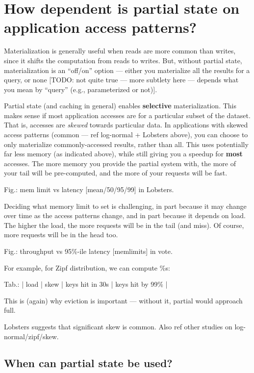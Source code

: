 \section{How dependent is partial state on application access patterns?}
\label{s:eval:patterns}

Materialization is generally useful when reads are more common than
writes, since it shifts the computation from reads to writes.
But, without partial state, materialization is an ``off/on'' option —
either you materialize all the results for a query, or none [TODO: not
quite true — more subtlety here — depends what you mean by ``query''
(e.g., parameterized or not)].

Partial state (and caching in general) enables \textbf{selective}
materialization. This makes sense if most application accesses are for
a particular subset of the dataset. That is, accesses are \textit{skewed}
towards particular data. In applications with skewed access patterns
(common — ref log-normal + Lobsters above), you can choose to only
materialize commonly-accessed results, rather than all. This uses
potentially far less memory (as indicated above), while still giving you
a speedup for \textbf{most} accesses. The more memory you provide the partial
system with, the more of your tail will be pre-computed, and the more of
your requests will be fast.

Fig.: mem limit vs latency [mean/50/95/99] in Lobsters.

Deciding what memory limit to set is challenging, in part because it
may change over time as the access patterns change, and in part because
it depends on load. The higher the load, the more requests will be in
the tail (and miss). Of course, more requests will be in the head too.

Fig.: throughput vs 95\%-ile latency [memlimits] in vote.

For example, for Zipf distribution, we can compute \%s:

Tab.: | load | skew | keys hit in 30s | keys hit by 99\% | 

This is (again) why eviction is important — without it, partial would approach
full.

Lobsters suggests that significant skew is common. Also ref other
studies on log-normal/zipf/skew.

\subsection{When can partial state be used?}


